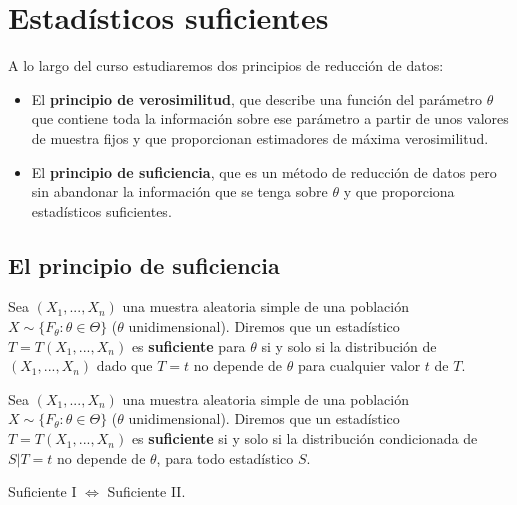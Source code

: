 \section{Estadísticos suficientes}

A lo largo del curso estudiaremos dos principios de reducción de datos:
\begin{itemize}
    \item El \textbf{principio de verosimilitud}, que describe una función del parámetro $\theta$ que contiene toda la información sobre ese parámetro a partir de unos valores de muestra fijos y que proporcionan estimadores de máxima verosimilitud.
    \item El \textbf{principio de suficiencia}, que es un método de reducción de datos pero sin abandonar la información que se tenga sobre $\theta$ y que proporciona estadísticos suficientes.
\end{itemize}

\subsection{El principio de suficiencia}

\begin{defi}[Suficiente I]
Sea $(X_1,...,X_n)$ una muestra aleatoria simple de una población $X \sim \{F_{\theta} : \theta \in \Theta\}$ ($\theta$ unidimensional). Diremos que un estadístico $T = T(X_1,...,X_n)$ es \textbf{suficiente} para $\theta$ si y solo si la distribución de $(X_1,...,X_n)$ dado que $T = t$ no depende de $\theta$ para cualquier valor $t$ de $T$. 
\end{defi}

\begin{defi}[Suficiente II]
Sea $(X_1,...,X_n)$ una muestra aleatoria simple de una población $X \sim \{F_{\theta} : \theta \in \Theta\}$ ($\theta$ unidimensional). Diremos que un estadístico $T = T(X_1,...,X_n)$ es \textbf{suficiente} si y solo si la distribución condicionada de $S | T = t$ no depende de $\theta$, para todo estadístico $S$.
\end{defi}

\begin{prop}
Suficiente I $\Longleftrightarrow$ Suficiente II.
\end{prop}

